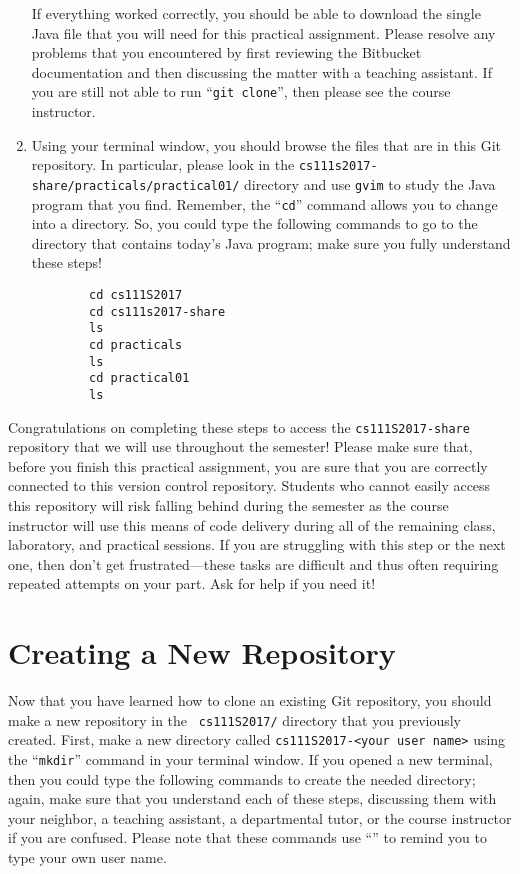 \begin{enumerate}
    If everything worked correctly, you should be able to download the single Java file that you will need for this
    practical assignment. Please resolve any problems that you encountered by first reviewing the Bitbucket
    documentation and then discussing the matter with a teaching assistant.  If you are still not able to run ``{\tt git
    clone}'', then please see the course instructor.

  \item Using your terminal window, you should browse the files that are in this Git repository.  In particular, please
    look in the {\tt cs111s2017-share/practicals/practical01/} directory and use {\tt gvim} to study the Java program
    that you find.  Remember, the ``{\tt cd}'' command allows you to change into a directory. So, you could type the
    following commands to go to the directory that contains today's Java program; make sure you fully understand these
    steps!

    \vspace*{-.1in}
    \begin{verbatim}
        cd cs111S2017
        cd cs111s2017-share
        ls
        cd practicals
        ls
        cd practical01
        ls
    \end{verbatim}
    \vspace*{-.5in}

    \end{enumerate}

    Congratulations on completing these steps to access the {\tt cs111S2017-share} repository that we will use
    throughout the semester! Please make sure that, before you finish this practical assignment, you are sure that you
    are correctly connected to this version control repository. Students who cannot easily access this repository will
    risk falling behind during the semester as the course instructor will use this means of code delivery during all of
    the remaining class, laboratory, and practical sessions. If you are struggling with this step or the next one, then
    don't get frustrated---these tasks are difficult and thus often requiring repeated attempts on your part. Ask for
    help if you need it!

\section*{Creating a New Repository}

Now that you have learned how to clone an existing Git repository, you should make a new repository in the {\tt
cs111S2017/} directory that you previously created.  First, make a new directory called {\tt cs111S2017-<your user
name>} using the ``{\tt mkdir}'' command in your terminal window. If you opened a new terminal, then you could type the
following commands to create the needed directory; again, make sure that you understand each of these steps, discussing
them with your neighbor, a teaching assistant, a departmental tutor, or the course instructor if you are confused.
Please note that these commands use ``{\tt <your user name>}'' to remind you to type your own user name.

